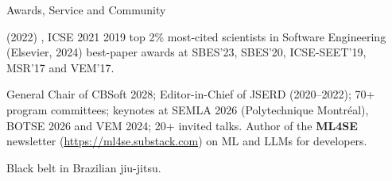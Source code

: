 \begin{rubric}{Awards, Service and Community}

\entry*[Awards]
   (2022) \textbullet{}
  , ICSE 2021 \textbullet{}
   2019 \textbullet{} top 2\% most-cited scientists in Software
  Engineering (Elsevier, 2024) \textbullet{} best-paper awards at SBES'23, SBES'20,
  ICSE-SEET'19, MSR'17 and VEM'17.

\entry*[Service]
  General Chair of CBSoft 2028; Editor-in-Chief of JSERD (2020--2022); 70+ program
  committees; keynotes at SEMLA 2026
  (Polytechnique Montréal), BOTSE 2026 and VEM 2024; 20+ invited talks.
  Author of the \textbf{ML4SE} newsletter (\url{https://ml4se.substack.com}) on ML and LLMs for
  developers.

  Black belt in Brazilian jiu-jitsu.

\end{rubric}
